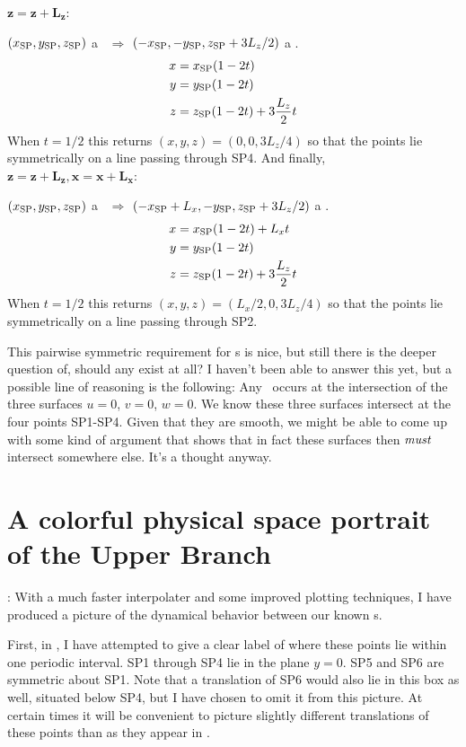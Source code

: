  \noindent$\mathbf{z = z + L_{z}}$:

 \noindent$(x_{{\text{SP}}},y_{{\text{SP}}},z_{{\text{SP}}})$ a \stagp\ $\Rightarrow$
 $(-x_{{\text{SP}}},-y_{{\text{SP}}},z_{{\text{SP}}}+3L_{z}/2)$ a \stagp.
 \begin{align}
  x &= x_{{\text{SP}}}(1-2t) \\
  y &= y_{{\text{SP}}}(1-2t) \\
  z &= z_{{\text{SP}}}(1-2t) + 3\frac{L_{z}}{2} t
 \end{align}
 When $t = 1/2$ this returns $(x,y,z) = (0,0,3L_{z}/4)$ so that the
 points lie symmetrically on a line passing through SP4. And
 finally, \\

 \noindent$\mathbf{z = z + L_{z}},\mathbf{x = x + L_{x}}$:

 \noindent$(x_{{\text{SP}}},y_{{\text{SP}}},z_{{\text{SP}}})$ a \stagp\ $\Rightarrow$
 $(-x_{{\text{SP}}}+L_{x},-y_{{\text{SP}}},z_{{\text{SP}}}+3L_{z}/2)$ a \stagp.
 \begin{align}
  x &= x_{{\text{SP}}}(1-2t) + L_{x}t \\
  y &= y_{{\text{SP}}}(1-2t) \\
  z &= z_{{\text{SP}}}(1-2t) + 3\frac{L_{z}}{2} t
 \end{align}
 When $t = 1/2$ this returns $(x,y,z) = (L_{x}/2,0,3L_{z}/4)$ so that the
 points lie symmetrically on a line passing through SP2.

 This pairwise symmetric requirement for \stagp s is nice, but still
 there is the deeper question of, should any exist at all? I haven't
 been able to answer this yet, but a possible line of reasoning is
 the following: Any \stagp\ occurs at the intersection of the three
 surfaces $u = 0$, $v = 0$, $w = 0$. We know these three surfaces
 intersect at the four points SP1-SP4. Given that they are smooth, we might be able to come up with some
 kind of argument that shows that in fact these surfaces then
 $\emph{must}$ intersect somewhere else. It's a thought anyway.


\section{A colorful physical space portrait of the Upper Branch}
 \label{sect:colorportrait}
 : With a much faster interpolater
 and some improved plotting techniques, I have produced a picture
 of the dynamical behavior between our known \stagp s.

 First, in , I have attempted to give
 a clear label of where these points lie within one periodic
 interval. SP1 through SP4 lie in the plane $y = 0$. SP5 and SP6 are
 symmetric about SP1. Note that a translation of SP6 would also lie in this box as well, situated
 below SP4, but I have chosen to omit it from this picture. At
 certain times it will be convenient to picture slightly different
 translations of these points than as they appear in
 .

